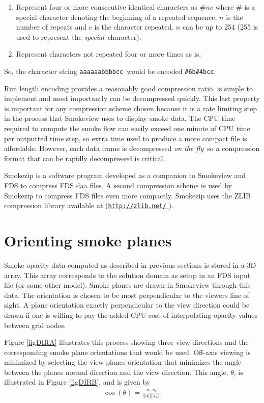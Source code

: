 \documentclass[11pt,twoside]{book}
\newcommand{\hhref}[1]{\href{#1}{{\tt #1}
}}
\begin{document}
\begin{enumerate}
\item Represent four or more consecutive identical characters as $\# n c$
where $\#$ is a special character denoting the beginning of a
repeated sequence, $n$ is the number of repeats and $c$ is the
character repeated.  $n$ can be up to 254 (255 is used to represent the {\em special}\ character).
\item Represent characters not repeated four or more times as is.
\end{enumerate}

So, the character string {\tt aaaaaabbbbcc}\ would be encoded {\tt \#6b\#4bcc}.

Run length encoding provides a reasonably good compression ratio, is simple to implement and most importantly can be decompressed quickly.
This last property is important for any compression scheme chosen because it is a rate limiting step in the process that Smokeview uses to display smoke data.
The CPU time required to compute the
smoke flow can easily exceed one minute of CPU time per outputted
time step, so extra time used to produce a more compact file is
affordable. However, each data frame is decompressed {\em on the
fly}\ so a compression format that can be rapidly decompressed is
critical.

Smokezip is a software program developed as a companion to Smokeview and FDS to compress FDS daa files.
A second compression scheme is used by Smokezip to compress FDS files even more compactly.  Smokezip uses the ZLIB compression library available at (\hhref{http://zlib.net/}).

%
%

\chapter{Orienting smoke planes}

Smoke opacity data computed as described in previous sections is stored in a 3D array.
This array corresponds to the solution domain as setup in an FDS input file (or some other model).
Smoke planes are drawn in Smokeview through this data.  The orientation is chosen to be most perpendicular
to the viewers line of sight.  A plane orientation exactly perpendicular to the view direction could be drawn
if one is willing to pay the added CPU cost of interpolating opacity values between grid nodes.

Figure \ref{figDIRA} illustrates this process showing three view directions and the corresponding smoke plane orientations that would be used.
Off-axis viewing is minimized by selecting the view planes orientation that minimizes the angle between the planes normal direction and the view direction.
This angle, $\theta$, is illustrated in Figure \ref{figDIRB}, and is given by
\begin{eqnarray*}
\cos(\theta)=\frac{n\cdot v_e}{||n||||v_e||}
\end{eqnarray*}
\end{document}
